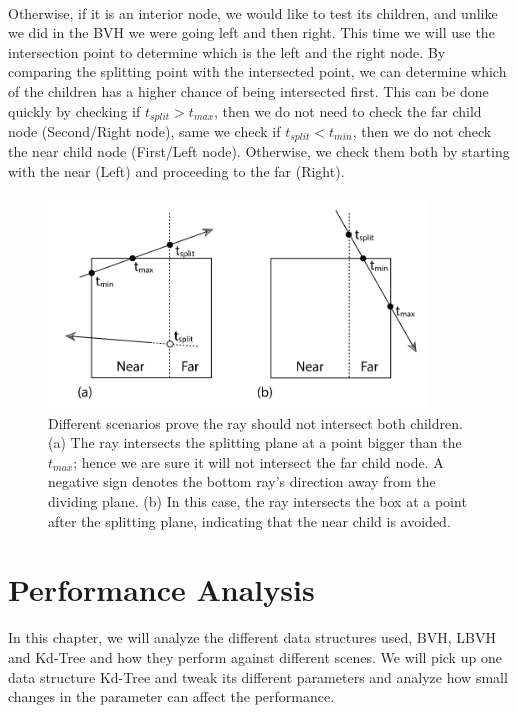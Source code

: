 \documentclass[11pt,a4paper]{article}
\begin{document}
\noindent
\\
Otherwise, if it is an interior node, we would like to test its children, and unlike we did in the BVH we were going left and then right. This time we will use the intersection point to determine which is the left and the right node. By comparing the splitting point with the intersected point, we can determine which of the children has a higher chance of being intersected first. This can be done quickly by checking if $t_{split} > t_{max}$, then we do not need to check the far child node (Second/Right node), same we check if $t_{split} < t_{min}$, then we do not check the near child node (First/Left node). Otherwise, we check them both by starting with the near (Left) and proceeding to the far (Right).  

\begin{figure}[H]	
     \centering
     \captionsetup{justification=centering,margin=2cm}
     \includegraphics[width=10cm]{images/kdtree/traversal_case.png}
     \caption{Different scenarios prove the ray should not intersect both children.(a) The ray intersects the splitting plane at a point bigger than the $t_{max}$; hence we are sure it will not intersect the far child node. A negative sign denotes the bottom ray's direction away from the dividing plane. (b) In this case, the ray intersects the box at a point after the splitting plane, indicating that the  near child is avoided. \protect\cite{Pharr2016}}
        \label{fig:dice}
\end{figure}

\clearpage

\section{Performance Analysis}
In this chapter, we will analyze the different data structures used, BVH, LBVH and Kd-Tree and how they perform against different scenes. We will pick up one data structure Kd-Tree and tweak its different parameters and analyze how small changes in the parameter can affect the performance.
\end{document}
